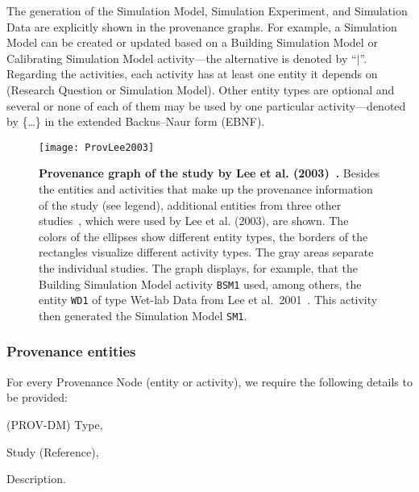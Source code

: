 \documentclass[10pt,letterpaper]{article}
\newcommand{\provnode}{Provenance Node}
\newcommand{\lee}{Lee et al. (2003)}
\newcommand{\RQ}{Research Question}
\newcommand{\SM}{Simulation Model}
\newcommand{\SE}{Simulation Experiment}
\newcommand{\SD}{Simulation Data}
\newcommand{\WD}{Wet-lab Data}
\newcommand{\BSM}{Building Simulation Model}
\newcommand{\CSM}{Calibrating Simulation Model}
\begin{document}
\begin{table}[!ht]
\begin{flushleft}
The generation of the \SM{}, \SE{}, and \SD{} are explicitly shown in the provenance graphs.
For example, a \SM{} can be created or updated based on a \BSM{} or \CSM{} activity---the alternative is denoted by \enquote{$\vert$}.
Regarding the activities, each activity has at least one entity it depends on (\RQ{} or \SM{}).
Other entity types are optional and several or none of each of them may be used by one particular activity---denoted by \{\ldots\} in the  extended Backus–Naur form (EBNF).
\end{flushleft}
\label{tab:entitiesandactivities}
\end{table}


  
\begin{figure}[!h]%
\begin{adjustwidth}{-2.25in}{0in}
\centering
\texttt{[image: ProvLee2003]}
\caption{{\bf Provenance graph of the study by \lee{}~\cite{Lee2003}.}
Besides the entities and activities that make up the provenance information of the study (see legend), additional entities from three other studies~\cite{Lee2001, Dajani2003, Salic2000}, which were used by \lee{}, are shown.
The colors of the ellipses show different entity types, the borders of the rectangles visualize different activity types.
The gray areas separate the individual studies.
The graph displays, for example, that the \BSM{} activity \texttt{BSM1} used, among others, the entity \texttt{WD1} of type \WD{} from Lee et al.~2001~\cite{Lee2001}.
This activity then generated the \SM{} \texttt{SM1}.
}
\label{fig:ProvLee}
\end{adjustwidth}
\end{figure}


\subsubsection*{Provenance entities} 


For every \provnode{} (entity or activity), we require the following details to be provided:
\begin{inparaenum}[a)]
\item (PROV-DM) Type,
\item Study (Reference),
\item Description.
\end{inparaenum}
\end{document}
